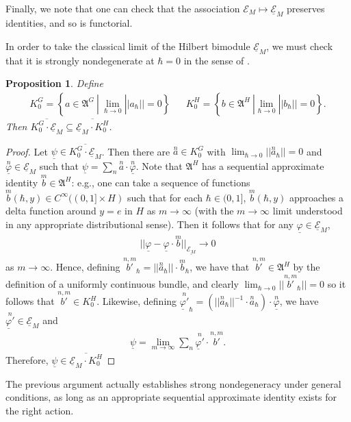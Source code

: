 \documentclass[sn-mathphys,Numbered]{sn-jnl}
\newtheorem{proposition}[theorem]{Proposition}%
\begin{document}
\noindent Finally, we note that one can check that the association $\mathcal{E}_M\mapsto \underline{\mathcal{E}}_M$ preserves identities, and so is functorial.

In order to take the classical limit of the Hilbert bimodule $\underline{\mathcal{E}}_M$, we must check that it is strongly nondegenerate at $\hbar =0$ in the sense of \citet{FeSt24}.\bigskip

\begin{proposition}
    Define
    \begin{align}
    K_0^G = \left\{a\in\mathfrak{A}^G\ |\ \lim_{\hbar\to 0} ||a_\hbar|| = 0 \right\} && K_0^H = \left\{b\in\mathfrak{A}^H\ | \lim_{\hbar\to 0}||b_\hbar|| = 0\right\}.
    \end{align}
    Then $\overline{K_0^G \cdot \underline{\mathcal{E}}_M}\subseteq \overline{\underline{\mathcal{E}}_M\cdot K_0^H}$.
\end{proposition}

\begin{proof}
    Let $\underline{\psi}\in\overline{K_0^G \cdot \underline{\mathcal{E}}_M}$.  Then there are $\overset{n}{a}\in K_0^G$ with $\lim_{\hbar\to 0}||\overset{n}{a}_\hbar|| = 0$ and $\overset{n}{\underline{\varphi}}\in\underline{\mathcal{E}}_M$ such that $\underline{\psi} = \sum_n \overset{n}{a}\cdot\overset{n}{\underline{\varphi}}$.  Note that $\mathfrak{A}^H$ has a sequential approximate identity $\overset{m}{b}\in\mathfrak{A}^H$: e.g., one can take a sequence of functions $\overset{m}{b}(\hbar,y)\in C^\infty((0,1]\times H)$ such that for each $\hbar\in (0,1]$, $\overset{m}{b}(\hbar,y)$ approaches a delta function around $y=e$ in $H$ as $m\to \infty$ (with the $m\to \infty$ limit understood in any appropriate distributional sense).  Then it follows that for any $\underline{\varphi}\in\underline{\mathcal{E}}_M$,
    \begin{align}
        ||\underline{\varphi} - \underline{\varphi}\cdot\overset{m}{b}||_{\underline{\mathcal{E}_M}}\to 0
    \end{align}
    as $m\to \infty$.  Hence, defining $\overset{n,m}{b'}_\hbar = ||\overset{n}{a}_\hbar||\cdot\overset{m}{b}_\hbar$, we have that $\overset{n,m}{b'}\in\mathfrak{A}^H$ by the definition of a uniformly continuous bundle, and clearly $\lim_{\hbar\to0}||\overset{n,m}{b'}_\hbar||= 0$ so it follows that $\overset{n,m}{b'}\in K_0^H$.  Likewise, defining $\overset{n}{\underline{\varphi}'}_\hbar = \left(||\overset{n}{a}_\hbar||^{-1}\cdot\overset{n}{a}_\hbar\right)\cdot \overset{n}{\underline{\varphi}}$, we have $\overset{n}{\underline{\varphi}'}\in\underline{\mathcal{E}}_M$ and
    \begin{align}
        \underline{\psi} = \lim_{m\to\infty}\sum_n \overset{n}{\underline{\varphi}'} \cdot \overset{n,m}{b'}.
    \end{align}
    Therefore, $\underline{\psi}\in \overline{\underline{\mathcal{E}}_M\cdot K_0^H}$
\end{proof}
\noindent The previous argument actually establishes strong nondegeneracy under general conditions, as long as an appropriate sequential approximate identity exists for the right action.
\end{document}
